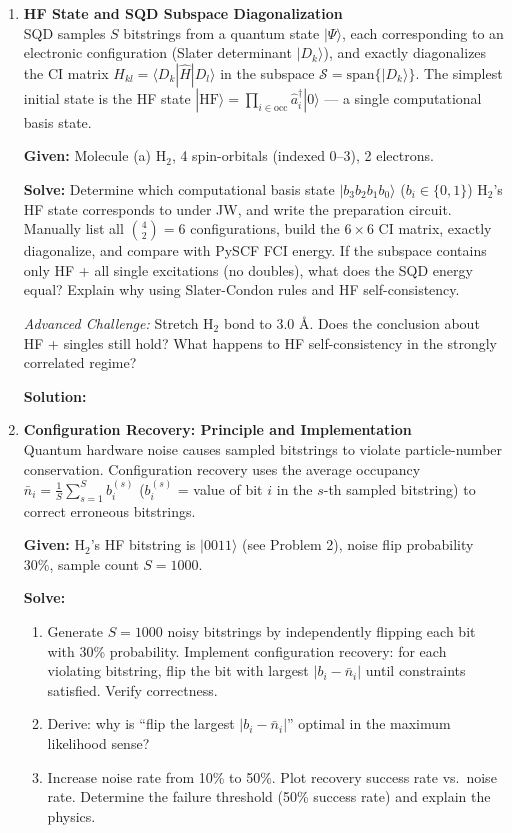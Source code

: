 \documentclass[fontset=mac]{ctexart}
\newcommand{\ket}[1]{|#1\rangle}
\newcommand{\bra}[1]{\langle #1|}
\begin{document}
\begin{enumerate}
    \item \textbf{HF State and SQD Subspace Diagonalization} \\ SQD samples $S$ bitstrings from a quantum state $\ket{\Psi}$, each corresponding to an electronic configuration (Slater determinant $\ket{D_k}$), and exactly diagonalizes the CI matrix $H_{kl}=\bra{D_k}\hat{H}\ket{D_l}$ in the subspace $\mathcal{S}=\text{span}\{\ket{D_k}\}$. The simplest initial state is the HF state $\ket{\text{HF}} = \prod_{i\in\text{occ}}\hat{a}_i^\dagger\ket{0}$ --- a single computational basis state.

    \textbf{Given:} Molecule (a) H$_2$, 4 spin-orbitals (indexed 0--3), 2 electrons.

    \textbf{Solve:} Determine which computational basis state $\ket{b_3 b_2 b_1 b_0}$ ($b_i\in\{0,1\}$) H$_2$'s HF state corresponds to under JW, and write the preparation circuit. Manually list all $\binom{4}{2}{=}6$ configurations, build the $6\times6$ CI matrix, exactly diagonalize, and compare with PySCF FCI energy. If the subspace contains only HF + all single excitations (no doubles), what does the SQD energy equal? Explain why using Slater-Condon rules and HF self-consistency.

    \emph{Advanced Challenge:} Stretch H$_2$ bond to 3.0 \AA. Does the conclusion about HF + singles still hold? What happens to HF self-consistency in the strongly correlated regime?

    \textbf{Solution:}

    \vspace{2em}

    \item \textbf{Configuration Recovery: Principle and Implementation} \\ Quantum hardware noise causes sampled bitstrings to violate particle-number conservation. Configuration recovery uses the average occupancy $\bar{n}_i = \frac{1}{S}\sum_{s=1}^{S} b_i^{(s)}$ ($b_i^{(s)}$ = value of bit $i$ in the $s$-th sampled bitstring) to correct erroneous bitstrings.

    \textbf{Given:} H$_2$'s HF bitstring is $\ket{0011}$ (see Problem 2), noise flip probability 30\%, sample count $S{=}1000$.

    \textbf{Solve:}
    \begin{enumerate}[label=(\alph*)]
        \item Generate $S{=}1000$ noisy bitstrings by independently flipping each bit with 30\% probability. Implement configuration recovery: for each violating bitstring, flip the bit with largest $|b_i - \bar{n}_i|$ until constraints satisfied. Verify correctness.
        \item Derive: why is ``flip the largest $|b_i - \bar{n}_i|$'' optimal in the maximum likelihood sense?
        \item Increase noise rate from 10\% to 50\%. Plot recovery success rate vs.\ noise rate. Determine the failure threshold (50\% success rate) and explain the physics.
    \end{enumerate}


\end{enumerate}
\end{document}
